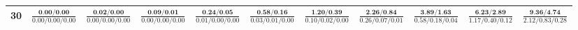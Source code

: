 \documentclass{slides}
\begin{document}
{{{\begin{tabular}{|c|c|c|c|c|c|c|c|c|c|c|}
\hline
30 & $\frac{\textbf{0.00/0.00}}{0.00/0.00/0.00}$ & $\frac{\textbf{0.02/0.00}}{0.00/0.00/0.00}$ & $\frac{\textbf{0.09/0.01}}{0.00/0.00/0.00}$ & $\frac{\textbf{0.24/0.05}}{0.01/0.00/0.00}$ & $\frac{\textbf{0.58/0.16}}{0.03/0.01/0.00}$ & $\frac{\textbf{1.20/0.39}}{0.10/0.02/0.00}$ & $\frac{\textbf{2.26/0.84}}{0.26/0.07/0.01}$ & $\frac{\textbf{3.89/1.63}}{0.58/0.18/0.04}$ & $\frac{\textbf{6.23/2.89}}{1.17/0.40/0.12}$ & $\frac{\textbf{9.36/4.74}}{2.12/0.83/0.28}$ \\
\hline
\end{tabular}}}}
\end{document}
